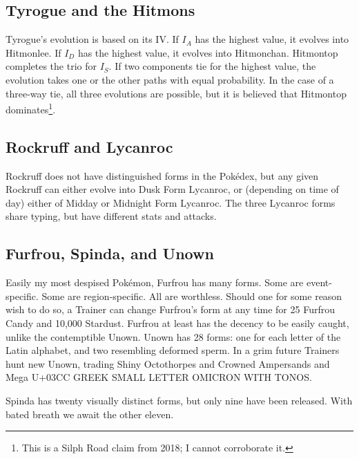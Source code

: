\subsection{Tyrogue and the Hitmons\label{subsec:tyrogue}}
Tyrogue's evolution is based on its IV.
If $I_A$ has the highest value, it evolves into Hitmonlee.
If $I_D$ has the highest value, it evolves into Hitmonchan.
Hitmontop completes the trio for $I_S$.
If two components tie for the highest value, the evolution takes one or the other
 paths with equal probability.
In the case of a three-way tie, all three evolutions are possible, but it is believed that Hitmontop
 dominates\footnote{This is a Silph Road claim from 2018; I cannot corroborate it.}.

\subsection{Rockruff and Lycanroc\label{subsec:rockruff}}
Rockruff does not have distinguished forms in the Pokédex, but any given Rockruff
 can either evolve into Dusk Form Lycanroc, or (depending on time of day)
 either of Midday or Midnight Form Lycanroc.
The three Lycanroc forms share typing, but have different stats and attacks.

\subsection{Furfrou, Spinda, and Unown\label{subsec:furfrou}}
Easily my most despised Pokémon, Furfrou has many forms.
Some are event-specific.
Some are region-specific.
All are worthless.
Should one for some reason wish to do so, a Trainer can change Furfrou's form
  at any time for 25 Furfrou Candy and 10,000 Stardust.
Furfrou at least has the decency to be easily caught, unlike the contemptible Unown.
Unown has 28 forms: one for each letter of the Latin alphabet, and two
  resembling deformed sperm.
In a grim future Trainers hunt new Unown, trading Shiny Octothorpes and
  Crowned Ampersands and Mega U+03CC GREEK SMALL LETTER OMICRON WITH TONOS.

Spinda has twenty visually distinct forms, but only nine have been released.
With bated breath we await the other eleven.
